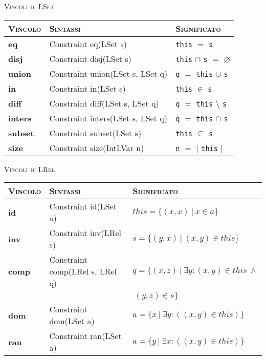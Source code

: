 \textsc{Vincoli di LSet}
\begin{table}[h]
\begin{tabular}{|l|l|l|}
\hline
\textsc{Vincolo} & \textsc{Sintassi}                	& \textsc{Significato}                               	\\ \hline
\textbf{eq}      & Constraint eq(LSet s)            	& \texttt{this} $=$ \texttt{s}                      	\\ \hline
\textbf{disj}    & Constraint disj(LSet s)          	& \texttt{this} $\cap$ \texttt{s} $=$ $\varnothing$ 	\\ \hline
\textbf{union}   & Constraint union(LSet s, LSet q) 	& \texttt{q} $=$ \texttt{this} $\cup$ \texttt{s}     	\\ \hline
\textbf{in}      & Constraint in(LSet s)            	& \texttt{this} $\in$ \texttt{s}                    	\\ \hline
\textbf{diff}    & Constraint diff(LSet s, LSet q)  	& \texttt{q} $=$ \texttt{this} $\setminus$ \texttt{s}   \\ \hline
\textbf{inters}  & Constraint inters(LSet s, LSet q)	& \texttt{q} $=$ \texttt{this} $\cap$ \texttt{s}        \\ \hline
\textbf{subset}  & Constraint subset(LSet s)        	& \texttt{this} $\subseteq$ \texttt{s}                  \\ \hline
\textbf{size}    & Constraint size(IntLVar n)       	& \texttt{n} $=$ $|$ \texttt{this} $|$              	\\ \hline
\end{tabular}
\end{table}


\textsc{Vincoli di LRel}

\begin{table}[h]
\begin{tabular}{|l|l|l|}
\hline
\textsc{Vincolo} & \textsc{Sintassi}                & \textsc{Significato}                               	\\ \hline
\textbf{id}      & Constraint id(LSet a)		    & $this = \{(x, x) \:| \: x \in a \}$  	\\ \hline
\textbf{inv}     & Constraint inv(LRel s)           & $s = \{ (y, x) \:| \: (x, y) \in this \}$ 	\\ \hline
\textbf{comp}    & Constraint comp(LRel s, LRel q)  & $q = \{ (x, z) \:| \: \exists y : (x, y) \in this \: \wedge $\\ & & $\: (y, z) \in s \}$ \\ \hline

\textbf{dom}     & Constraint dom(LSet a)           & $a = \{ x \:| \: \exists y : ((x, y) \in this)\}$ 	\\ \hline
\textbf{ran}     & Constraint ran(LSet a)           & $a = \{ y \:| \: \exists x : ((x, y) \in this)\}$ 	\\ \hline
\end{tabular}
\end{table}

